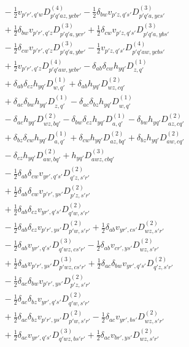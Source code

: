 \begin{align*}
&\quad -\tfrac12v_{p'r',q'w}D^{(4)}_{p'q'az,ycbr'}-\tfrac12\delta_{bw}v_{p'z,q's'}D^{(3)}_{p'q'a,ycs'} \\
&\quad +\tfrac12\delta_{bw}v_{p'r',q'z}D^{(3)}_{p'q'a,ycr'}+\tfrac12\delta_{cw}v_{p'z,q's'}D^{(3)}_{p'q'a,ybs'} \\
&\quad -\tfrac12\delta_{cw}v_{p'r',q'z}D^{(3)}_{p'q'a,ybr'}-\tfrac12v_{p'z,q's'}D^{(4)}_{p'q'aw,ycbs'} \\
&\quad +\tfrac12v_{p'r',q'z}D^{(4)}_{p'q'aw,ycbr'}-\delta_{ab}\delta_{cw}h_{yq'}D^{(1)}_{z,q'} \\
&\quad +\delta_{ab}\delta_{cz}h_{yq'}D^{(1)}_{w,q'}+\delta_{ab}h_{yq'}D^{(2)}_{wz,cq'} \\
&\quad +\delta_{ac}\delta_{bw}h_{yq'}D^{(1)}_{z,q'}-\delta_{ac}\delta_{bz}h_{yq'}D^{(1)}_{w,q'} \\
&\quad -\delta_{ac}h_{yq'}D^{(2)}_{wz,bq'}-\delta_{bw}\delta_{cz}h_{yq'}D^{(1)}_{a,q'}-\delta_{bw}h_{yq'}D^{(2)}_{az,cq'} \\
&\quad +\delta_{bz}\delta_{cw}h_{yq'}D^{(1)}_{a,q'}+\delta_{cw}h_{yq'}D^{(2)}_{az,bq'}+\delta_{bz}h_{yq'}D^{(2)}_{aw,cq'} \\
&\quad -\delta_{cz}h_{yq'}D^{(2)}_{aw,bq'}+h_{yq'}D^{(3)}_{awz,cbq'} \\
&\quad -\tfrac12\delta_{ab}\delta_{cw}v_{yr',q's'}D^{(2)}_{q'z,s'r'} \\
&\quad +\tfrac12\delta_{ab}\delta_{cw}v_{p'r',ys'}D^{(2)}_{p'z,s'r'} \\
&\quad +\tfrac12\delta_{ab}\delta_{cz}v_{yr',q's'}D^{(2)}_{q'w,s'r'} \\
&\quad -\tfrac12\delta_{ab}\delta_{cz}v_{p'r',ys'}D^{(2)}_{p'w,s'r'}+\tfrac12\delta_{ab}v_{yr',cs'}D^{(2)}_{wz,s'r'} \\
&\quad -\tfrac12\delta_{ab}v_{yr',q's'}D^{(3)}_{q'wz,cs'r'}-\tfrac12\delta_{ab}v_{cr',ys'}D^{(2)}_{wz,s'r'} \\
&\quad +\tfrac12\delta_{ab}v_{p'r',ys'}D^{(3)}_{p'wz,cs'r'}+\tfrac12\delta_{ac}\delta_{bw}v_{yr',q's'}D^{(2)}_{q'z,s'r'} \\
&\quad -\tfrac12\delta_{ac}\delta_{bw}v_{p'r',ys'}D^{(2)}_{p'z,s'r'} \\
&\quad -\tfrac12\delta_{ac}\delta_{bz}v_{yr',q's'}D^{(2)}_{q'w,s'r'} \\
&\quad +\tfrac12\delta_{ac}\delta_{bz}v_{p'r',ys'}D^{(2)}_{p'w,s'r'}-\tfrac12\delta_{ac}v_{yr',bs'}D^{(2)}_{wz,s'r'} \\
&\quad +\tfrac12\delta_{ac}v_{yr',q's'}D^{(3)}_{q'wz,bs'r'}+\tfrac12\delta_{ac}v_{br',ys'}D^{(2)}_{wz,s'r'} \\

\end{align*}
